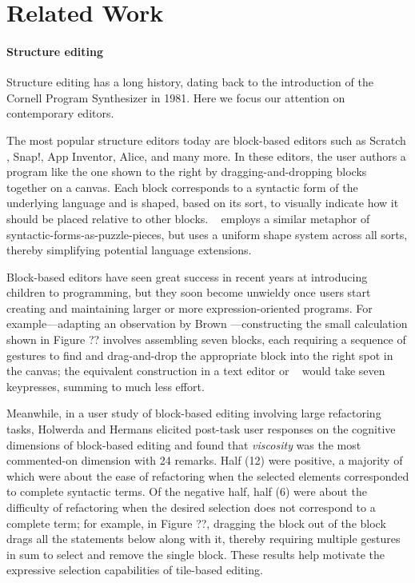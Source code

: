 \section{Related Work}\label{sec:related-work}

\paragraph{Structure editing}
Structure editing has a long history, dating back
to the introduction of the Cornell Program Synthesizer
\cite{Cornell} in 1981.
Here we focus our attention on contemporary editors.

The most popular structure editors today
are block-based editors such as Scratch \cite{scratch}, Snap!,
App Inventor, Alice, and many more.
In these editors, the user authors a program
like the one shown to the right
by dragging-and-dropping blocks together on a canvas.
Each block corresponds to a syntactic form of
the underlying language and is shaped, based on its
sort, to visually indicate how it should be placed relative
to other blocks.
\tylr~ employs a similar metaphor of syntactic-forms-as-puzzle-pieces,
but uses a uniform shape system across all sorts,
thereby simplifying potential language extensions.

Block-based editors have seen great success in recent years
at introducing children to programming, but they soon
become unwieldy once users start creating and maintaining
larger or more expression-oriented programs.
For example---adapting an observation by
Brown \etal \cite{no-keyboard-cripples}---constructing
the small calculation shown in
Figure ?? involves assembling seven blocks, each
requiring a sequence of gestures to find and
drag-and-drop the appropriate block into the right spot
in the canvas;
the equivalent construction in a text editor or \tylr~ would
take seven keypresses, summing to much less effort.

Meanwhile, in a user study of block-based editing
involving large refactoring tasks,
Holwerda and Hermans elicited post-task user responses
on the cognitive dimensions of block-based editing and
found that \emph{viscosity} was the most commented-on
dimension with 24 remarks.
Half (12) were positive, a majority of which
were about the ease of refactoring when the selected
elements corresponded to complete syntactic terms.
Of the negative half, half (6) were about the difficulty
of refactoring when the desired selection
does not correspond to a complete term;
for example, in Figure ??, dragging the  block out of
the  block drags all the statements below
along with it, thereby requiring multiple gestures
in sum to select and remove the single  block.
These results help motivate the expressive selection
capabilities of tile-based editing.

